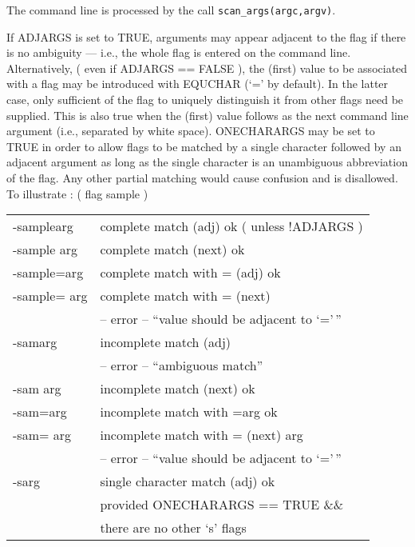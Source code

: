 The command line is processed by the call \verb+scan_args(argc,argv)+.

If ADJARGS is set to TRUE, arguments may appear adjacent to the flag
if there is no ambiguity --- i.e., the whole flag is entered on the
command line.  Alternatively, ( even if ADJARGS == FALSE ), the (first)
value to be associated with a flag may be introduced with EQUCHAR (`=' by
default).  In the latter case, only sufficient of the flag to uniquely
distinguish it from other flags need be supplied.  This is also true when
the (first) value follows as the next command line argument (i.e., separated
by white space).
ONECHARARGS may be set to TRUE in order to allow flags to be matched
by a single character followed by an adjacent argument as long as the
single character is an unambiguous abbreviation of the flag.  Any other
partial matching would cause confusion and is disallowed.\\[2ex]

To illustrate : ( flag sample )

\footnotesize
\begin{tabular}{ll}
        -samplearg              &complete match (adj) ok  ( unless !ADJARGS )\\
        -sample arg             &complete match (next) ok\\
        -sample=arg             &complete match with = (adj) ok\\
        -sample= arg            &complete match with = (next)\\
                                &-- error -- ``value should be adjacent to `='\,''\\

        -samarg                 &incomplete match (adj)\\
                                &-- error -- ``ambiguous match''\\
        -sam arg                &incomplete match (next) ok\\
        -sam=arg                &incomplete match with =arg ok\\
        -sam= arg               &incomplete match with = (next) arg\\
                                &-- error -- ``value should be adjacent to `='\,''\\
        -sarg                   & single character match (adj) ok\\
                                & provided ONECHARARGS == TRUE \&\& \\
                                & there are no other `s' flags \\

\end{tabular}
\normalsize


